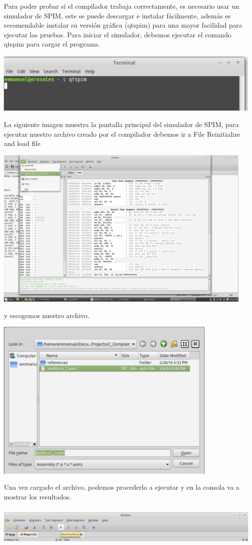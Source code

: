 \documentclass[12pt]{article}
\begin{document}
    Para poder probar si el compilador trabaja correctamente, es necesario usar un simulador de SPIM, este se puede descargar e instalar fácilmente, además es recomendable instalar su versión gráfica (qtspim) para una mayor facilidad para ejecutar las pruebas.
    Para iniciar el simulador, debemos ejecutar el comando qtspim para cargar el programa.
    
    \begin{center}
    \includegraphics[height= 3cm]{main6}
    \end{center}

    La siguiente imagen muestra la pantalla principal del simulador de SPIM, para ejecutar nuestro archivo creado por el compilador debemos ir a File  Reinitialize and load file 
    
    \begin{center}
    \includegraphics[height= 8cm]{main7}
    \end{center}

    y escogemos nuestro archivo.
\begin{center}
    \includegraphics[height= 8cm]{main8}
    \end{center}

    Una vez cargado el archivo, podemos procederlo a ejecutar y en la consola va a mostrar los resultados.

\begin{center}
    \includegraphics[height= 2cm]{main9}
    \end{center}
\end{document}
